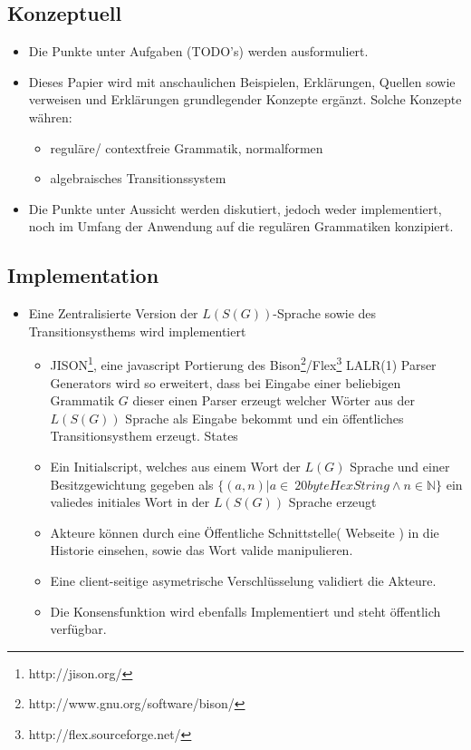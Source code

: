 \documentclass[]{article}
\begin{document}
\subsection*{Konzeptuell}
\begin{itemize}
  \item Die Punkte unter Aufgaben (TODO's) werden ausformuliert.
  \item Dieses Papier wird mit anschaulichen Beispielen, Erklärungen, Quellen sowie verweisen und Erklärungen grundlegender Konzepte ergänzt. Solche Konzepte währen: 
    \begin{itemize}
      \item reguläre/ contextfreie Grammatik, normalformen
      \item algebraisches Transitionssystem
    \end{itemize}
  \item Die Punkte unter Aussicht werden diskutiert, jedoch weder implementiert, noch im Umfang der Anwendung auf die regulären Grammatiken konzipiert.
\end{itemize}


\subsection*{Implementation}
\begin{itemize}
  \item Eine Zentralisierte Version der $L(S(G))$-Sprache sowie des Transitionsysthems wird implementiert 
  \begin{itemize}
    \item JISON\footnote{http://jison.org/}, eine javascript Portierung des Bison\footnote{http://www.gnu.org/software/bison/}/Flex\footnote{http://flex.sourceforge.net/} LALR(1) Parser Generators wird so erweitert, dass bei Eingabe einer beliebigen Grammatik $G$ dieser einen Parser erzeugt welcher Wörter aus der $L(S(G))$ Sprache als Eingabe bekommt und ein öffentliches Transitionsysthem erzeugt.
 States   \item Ein Initialscript, welches aus einem Wort der $L(G)$ Sprache und einer Besitzgewichtung gegeben als $\{(a,n)| a\in\ 20byteHexString \land n\in \mathbb{N} \}$ ein valiedes initiales Wort in der $L(S(G))$ Sprache erzeugt 
    \item Akteure können durch eine Öffentliche Schnittstelle( Webseite ) in die Historie einsehen, sowie das Wort valide manipulieren.
    \item Eine client-seitige asymetrische Verschlüsselung validiert die Akteure.
    \item Die Konsensfunktion wird ebenfalls Implementiert und steht öffentlich verfügbar.
  \end{itemize}
\end{itemize}
\end{document}
